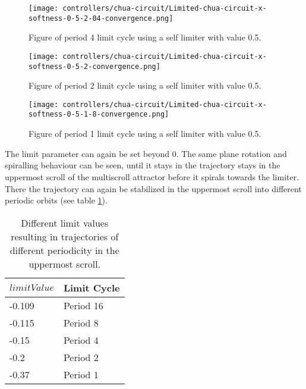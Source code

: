 \documentclass[main]{subfiles}
\begin{document}
\begin{figure}[H]
\centering
\texttt{[image: controllers/chua-circuit/Limited-chua-circuit-x-softness-0-5-2-04-convergence.png]}
\caption[Figure of period 4 limit cycle]{Figure of period 4 limit cycle using a self limiter with value 0.5.}
\label{figure:x-0.5-4-limit-cycle-trajectory}
\end{figure}

\begin{figure}[H]
\centering
\texttt{[image: controllers/chua-circuit/Limited-chua-circuit-x-softness-0-5-2-convergence.png]}
\caption[Figure of period 2 limit cycle]{Figure of period 2 limit cycle using a self limiter with value 0.5.}
\label{figure:x-0.5-2-limit-cycle-trajectory}
\end{figure}

\begin{figure}[H]
\centering
\texttt{[image: controllers/chua-circuit/Limited-chua-circuit-x-softness-0-5-1-8-convergence.png]}
\caption[Figure of period 1 limit cycle]{Figure of period 1 limit cycle using a self limiter with value 0.5.}
\label{figure:x-0.5-1-limit-cycle-trajectory}
\end{figure}

The limit parameter can again be set beyond 0. The same plane rotation and spiralling behaviour can be seen, until it stays in the trajectory stays in the uppermost scroll of the multiscroll attractor before it spirals towards the limiter. %
%
There the trajectory can again be stabilized in the uppermost scroll into different periodic orbits (see table \ref{table:x-0.5-upperscroll-periodicities}).

\begin{table}[H]
\renewcommand{\arraystretch}{1.2}
\center
\begin{tabular}{@{}ll@{}}
	\toprule
   \(limitValue\) & Limit Cycle\\
   \midrule
   -0.109 & Period 16 \\
   -0.115 & Period 8 \\ 
   -0.15 & Period 4 \\
   -0.2  & Period 2 \\
   -0.37 & Period 1 \\
   \bottomrule
\end{tabular}
\caption[Limiter values for periodic trajectories for for an x self-limiting limiter with softness 0.13]{Different limit values resulting in trajectories of different periodicity in the uppermost scroll.}
\label{table:x-0.5-upperscroll-periodicities}
\end{table}
\end{document}
